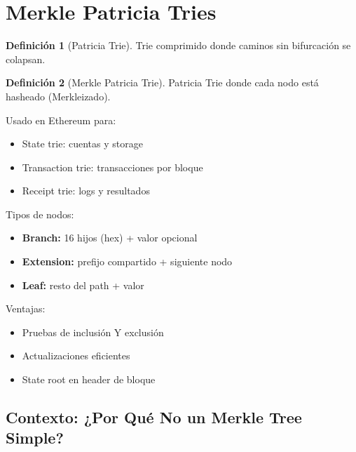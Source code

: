 \documentclass[11pt,a4paper,twoside,openright]{book}
\theoremstyle{definition}
\newtheorem{definition}{Definición}[chapter]
\theoremstyle{plain}
\theoremstyle{remark}
\begin{document}
\section{Merkle Patricia Tries}

\begin{definition}[Patricia Trie]
Trie comprimido donde caminos sin bifurcación se colapsan.
\end{definition}

\begin{definition}[Merkle Patricia Trie]
Patricia Trie donde cada nodo está hasheado (Merkleizado).
\end{definition}

Usado en Ethereum para:
\begin{itemize}
    \item State trie: cuentas y storage
    \item Transaction trie: transacciones por bloque
    \item Receipt trie: logs y resultados
\end{itemize}

Tipos de nodos:
\begin{itemize}
    \item \textbf{Branch:} 16 hijos (hex) + valor opcional
    \item \textbf{Extension:} prefijo compartido + siguiente nodo
    \item \textbf{Leaf:} resto del path + valor
\end{itemize}

Ventajas:
\begin{itemize}
    \item Pruebas de inclusión Y exclusión
    \item Actualizaciones eficientes
    \item State root en header de bloque
\end{itemize}

\subsection{Contexto: ¿Por Qué No un Merkle Tree Simple?}
\end{document}
